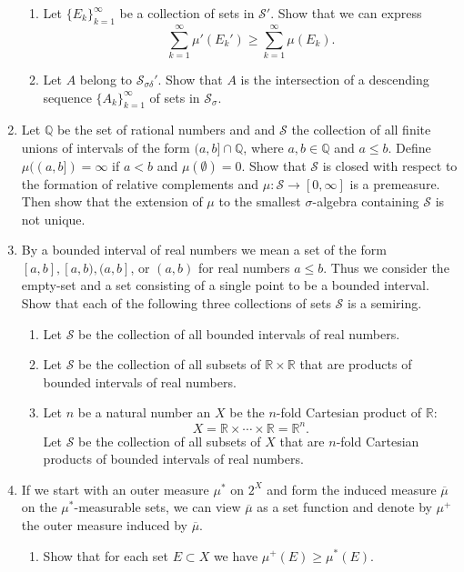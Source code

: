 \begin{enumerate}
\begin{enumerate}[label=(\roman*),align=left]
		\item Let $\{E_k\}_{k=1}^\infty$ be a collection of sets in $\mathcal{S}'$. Show that we can express 
		\[
			\sum_{k=1}^\infty \mu'(E_k')\ge\sum_{k=1}^\infty \mu(E_k).
		\]
		\item Let $A$ belong to $\mathcal{S}_{\sigma\delta}'$. Show that $A$ is the intersection of a descending sequence $\{A_k\}_{k=1}^\infty$ of sets in $\mathcal{S}_\sigma$.
	\end{enumerate}
	\item Let $\mathbb{Q}$ be the set of rational numbers and and $\mathcal{S}$ the collection of all finite unions of intervals of the form $(a,b]\cap\mathbb{Q}$, where $a,b\in\mathbb{Q}$ and $a\le b$. 
	Define $\mu((a,b])=\infty$ if $a<b$ and $\mu(\emptyset)=0$.
	Show that $\mathcal{S}$ is closed with respect to the formation of relative complements and $\mu:\mathcal{S}\to[0,\infty]$ is a premeasure.
	Then show that the extension of $\mu$ to the smallest $\sigma$-algebra containing $\mathcal{S}$ is not unique.
	\item By a bounded interval of real numbers we mean a set of the form $[a,b],[a,b),(a,b]$, or $(a,b)$ for real numbers $a\le b$.
	Thus we consider the empty-set and a set consisting of a single point to be a bounded interval.
	Show that each of the following three collections of sets $\mathcal{S}$ is a semiring.
	\begin{enumerate}[label=(\roman*),align=left]  
		\item Let $\mathcal{S}$ be the collection of all bounded intervals of real numbers.
		\item Let $\mathcal{S}$ be the collection of all subsets of $\mathbb{R}\times\mathbb{R}$ that are products of bounded intervals of real numbers.
		\item Let $n$ be a natural number an $X$ be the $n$-fold Cartesian product of $\mathbb{R}$:
		\[
			X=\mathbb{R}\times\cdots\times\mathbb{R}=\mathbb{R}^n.
		\]
		Let $\mathcal{S}$ be the collection of all subsets of $X$ that are $n$-fold Cartesian products of bounded intervals of real numbers.
	\end{enumerate}
	\item If we start with an outer measure $\mu^*$ on $2^X$ and form the induced measure $\overline\mu$ on the $\mu^*$-measurable sets, we can view $\overline\mu$ as a set function and denote by $\mu^+$ the outer measure induced by $\overline\mu$.
	\begin{enumerate}[label=(\roman*),align=left]  
		\item Show that for each set $E\subset X$ we have $\mu^+(E)\ge\mu^*(E)$.

\end{enumerate}
\end{enumerate}
